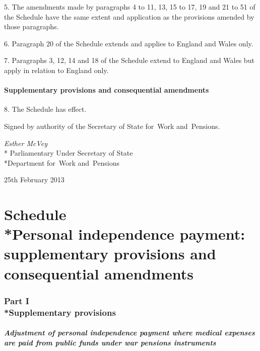 \documentclass[12pt,a4paper]{article}
\begin{document}
\medskip

5.  The amendments made by paragraphs 4 to 11, 13, 15 to 17, 19 and 21 to 51 of the Schedule have the same extent and application as the provisions amended by those paragraphs.

\medskip

6.  Paragraph 20 of the Schedule extends and applies to England and Wales only.

\medskip

7.  Paragraphs 3, 12, 14 and 18 of the Schedule extend to England and Wales but apply in relation to England only.

\subsection[8. Supplementary provisions and consequential amendments]{\sloppy Supplementary provisions and consequential amendments}

8.  The Schedule has effect. 

\bigskip

\pagebreak[3]

Signed 
by authority of the 
Secretary of State for~Work and~Pensions.

{\raggedleft
\emph{Esther McVey}\\*
Parliamentary Under Secretary 
of State\\*Department 
for~Work and~Pensions

}

25th February 2013

\small

\part[Schedule --- Personal independence payment: supplementary provisions and consequential amendments]{Schedule\\*Personal independence payment: supplementary provisions and consequential amendments}

\section[Part I --- Supplementary provisions]{Part I\\*Supplementary provisions}

\renewcommand\parthead{--- Schedule Part I}

\subsection*{\itshape Adjustment of personal independence payment where medical expenses are paid from public funds under war pensions instruments}
\end{document}
